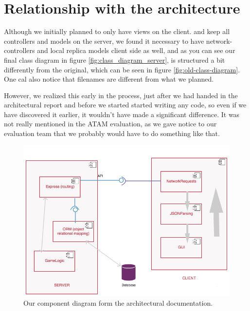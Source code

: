 \section{Relationship with the architecture}

Although we initially planned to only have views on the client. and keep all controllers and models on the server, we found it necessary to have network-controllers and local replica models client side as well, and as you can see our final class diagram in figure \ref{fig:class_diagram_server}, is structured a bit differently from the original, which can be seen in figure \ref{fig:old-class-diagram}. One cal also notice that filenames are different from what we planned.

However, we realized this early in the process, just after we had handed in the architectural report and before we started started writing any code, so even if we have discovered it earlier, it wouldn't have made a significant difference. It was not really mentioned in the ATAM evaluation, as we gave notice to our evaluation team that we probably would have to do something like that.

\begin{figure}[H]
    \includegraphics[scale=0.5]{figs/component.png}
    \caption{Our component diagram form the architectural documentation.}
    \label{fig:old-component-diagram}
\end{figure}

